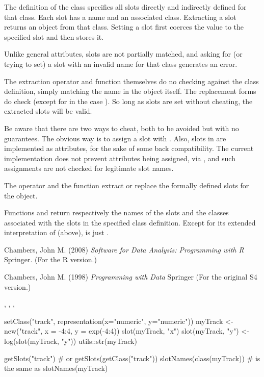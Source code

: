 %
\begin{Details}\relax
The definition of the class specifies all slots directly and
indirectly defined for that class.  Each slot has a name and an
associated class.  Extracting a slot returns an object from that
class.  Setting a slot first coerces the value to the specified slot
and then stores it.

Unlike general attributes, slots are not partially matched, and asking
for (or trying to set) a slot with an invalid name for that class
generates an error.

The  extraction operator and 
function themselves do no checking against the class definition,
simply matching the name in the object itself.
The replacement forms do check (except for  in the case
).  So long as slots are set without cheating, the
extracted slots will be valid.

Be aware that there are two ways to cheat, both to be avoided but
with no guarantees.  The obvious way is to assign a slot with
.  Also, slots in \R{} are implemented as
attributes, for the sake of some back compatibility.  The current
implementation does not prevent attributes being assigned, via
, and such assignments are not checked for
legitimate slot names.
\end{Details}
%
\begin{Value}
The  operator and the  function extract or
replace the formally defined slots for the object.

Functions  and  return respectively the
names of the slots and the classes associated with the slots in the
specified class definition.  Except for its extended interpretation of
 (above),  is just .
\end{Value}
%
\begin{References}\relax
Chambers, John M. (2008)
\emph{Software for Data Analysis: Programming with R}
Springer.  (For the R version.)

Chambers, John M. (1998)
\emph{Programming with Data}
Springer (For the original S4 version.)
\end{References}
%
\begin{SeeAlso}\relax
{},
,
,
\end{SeeAlso}
%
\begin{Examples}
\begin{ExampleCode}


setClass("track", representation(x="numeric", y="numeric"))
myTrack <- new("track", x = -4:4, y = exp(-4:4))
slot(myTrack, "x")
slot(myTrack, "y") <- log(slot(myTrack, "y"))
utils::str(myTrack)

getSlots("track") # or
getSlots(getClass("track"))
slotNames(class(myTrack)) # is the same as
slotNames(myTrack)


\end{ExampleCode}
\end{Examples}
